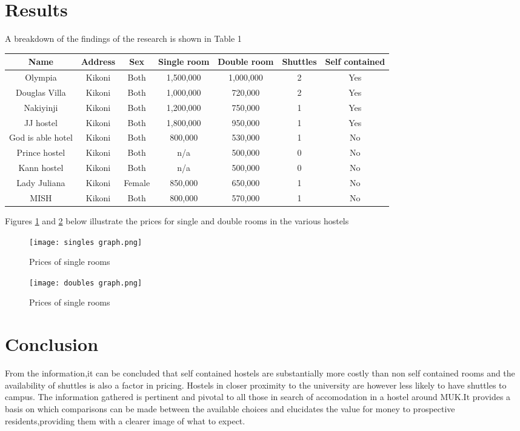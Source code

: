 \documentclass{article}
\begin{document}
\section{Results}
A breakdown of the findings of the research is shown in Table 1\\
\begin{tabular}{|c|c|c|c|c|c|c|}
\hline
\textbf{Name} &  \textbf{Address} & \textbf{Sex} & \textbf{Single room} & \textbf{Double room} & \textbf{Shuttles} & \textbf{Self contained}\\
\hline
Olympia &Kikoni& Both& 1,500,000& 1,000,000 &2 & Yes\\
\hline
Douglas Villa & Kikoni & Both & 1,000,000 &720,000& 2& Yes \\
\hline
Nakiyinji &Kikoni& Both& 1,200,000& 750,000& 1 & Yes\\
\hline
JJ hostel& Kikoni& Both &1,800,000& 950,000& 1& Yes \\
\hline
God is able hotel& Kikoni& Both& 800,000& 530,000& 1& No \\
\hline
Prince hostel& Kikoni& Both& n/a& 500,000& 0 & No\\
\hline
Kann hostel& Kikoni& Both& n/a& 500,000& 0 & No\\
\hline
Lady Juliana& Kikoni& Female& 850,000& 650,000& 1 & No\\
\hline
MISH& Kikoni& Both& 800,000& 570,000& 1 & No \\
\hline
\end{tabular}


Figures \ref{graph1} and \ref{graph2} below illustrate the prices for single and double rooms in the various hostels

\begin{figure}[h!]
\centering
\texttt{[image: singles graph.png]}
\caption{Prices of single rooms}
\label{graph1}
\end{figure}

\begin{figure}[h!]
\centering
\texttt{[image: doubles graph.png]}
\caption{Prices of single rooms}
\label{graph2}
\end{figure}


\section{Conclusion}
From the information,it can be concluded that self contained hostels are substantially more costly than non self contained rooms and the availability of shuttles is also a factor in pricing. Hostels in closer proximity to the university are however less likely to have shuttles to campus.
The information gathered is pertinent and pivotal to all those in search of accomodation in a hostel around MUK.It provides a basis on which comparisons can be made between the available choices and elucidates the value for money to prospective residents,providing them with a clearer image of what to expect.
\end{document}
